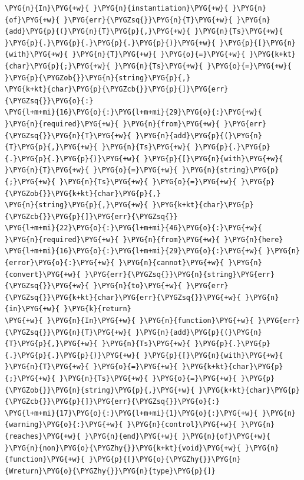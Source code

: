 \begin{codeblockbg}
\begin{Verbatim}[commandchars=\\\{\},breaklines=true,breakanywhere=true,fontsize=\codefont,xleftmargin=17bp]
\PYG{n}{In}\PYG{+w}{ }\PYG{n}{instantiation}\PYG{+w}{ }\PYG{n}{of}\PYG{+w}{ }\PYG{err}{\PYGZsq{}}\PYG{n}{T}\PYG{+w}{ }\PYG{n}{add}\PYG{p}{(}\PYG{n}{T}\PYG{p}{,}\PYG{+w}{ }\PYG{n}{Ts}\PYG{+w}{ }\PYG{p}{.}\PYG{p}{.}\PYG{p}{.}\PYG{p}{)}\PYG{+w}{ }\PYG{p}{[}\PYG{n}{with}\PYG{+w}{ }\PYG{n}{T}\PYG{+w}{ }\PYG{o}{=}\PYG{+w}{ }\PYG{k+kt}{char}\PYG{p}{;}\PYG{+w}{ }\PYG{n}{Ts}\PYG{+w}{ }\PYG{o}{=}\PYG{+w}{ }\PYG{p}{\PYGZob{}}\PYG{n}{string}\PYG{p}{,}
\PYG{k+kt}{char}\PYG{p}{\PYGZcb{}}\PYG{p}{]}\PYG{err}{\PYGZsq{}}\PYG{o}{:}
\PYG{l+m+mi}{16}\PYG{o}{:}\PYG{l+m+mi}{29}\PYG{o}{:}\PYG{+w}{   }\PYG{n}{required}\PYG{+w}{ }\PYG{n}{from}\PYG{+w}{ }\PYG{err}{\PYGZsq{}}\PYG{n}{T}\PYG{+w}{ }\PYG{n}{add}\PYG{p}{(}\PYG{n}{T}\PYG{p}{,}\PYG{+w}{ }\PYG{n}{Ts}\PYG{+w}{ }\PYG{p}{.}\PYG{p}{.}\PYG{p}{.}\PYG{p}{)}\PYG{+w}{ }\PYG{p}{[}\PYG{n}{with}\PYG{+w}{ }\PYG{n}{T}\PYG{+w}{ }\PYG{o}{=}\PYG{+w}{ }\PYG{n}{string}\PYG{p}{;}\PYG{+w}{ }\PYG{n}{Ts}\PYG{+w}{ }\PYG{o}{=}\PYG{+w}{ }\PYG{p}{\PYGZob{}}\PYG{k+kt}{char}\PYG{p}{,}
\PYG{n}{string}\PYG{p}{,}\PYG{+w}{ }\PYG{k+kt}{char}\PYG{p}{\PYGZcb{}}\PYG{p}{]}\PYG{err}{\PYGZsq{}}
\PYG{l+m+mi}{22}\PYG{o}{:}\PYG{l+m+mi}{46}\PYG{o}{:}\PYG{+w}{   }\PYG{n}{required}\PYG{+w}{ }\PYG{n}{from}\PYG{+w}{ }\PYG{n}{here}
\PYG{l+m+mi}{16}\PYG{o}{:}\PYG{l+m+mi}{29}\PYG{o}{:}\PYG{+w}{ }\PYG{n}{error}\PYG{o}{:}\PYG{+w}{ }\PYG{n}{cannot}\PYG{+w}{ }\PYG{n}{convert}\PYG{+w}{ }\PYG{err}{\PYGZsq{}}\PYG{n}{string}\PYG{err}{\PYGZsq{}}\PYG{+w}{ }\PYG{n}{to}\PYG{+w}{ }\PYG{err}{\PYGZsq{}}\PYG{k+kt}{char}\PYG{err}{\PYGZsq{}}\PYG{+w}{ }\PYG{n}{in}\PYG{+w}{ }\PYG{k}{return}
\PYG{+w}{ }\PYG{n}{In}\PYG{+w}{ }\PYG{n}{function}\PYG{+w}{ }\PYG{err}{\PYGZsq{}}\PYG{n}{T}\PYG{+w}{ }\PYG{n}{add}\PYG{p}{(}\PYG{n}{T}\PYG{p}{,}\PYG{+w}{ }\PYG{n}{Ts}\PYG{+w}{ }\PYG{p}{.}\PYG{p}{.}\PYG{p}{.}\PYG{p}{)}\PYG{+w}{ }\PYG{p}{[}\PYG{n}{with}\PYG{+w}{ }\PYG{n}{T}\PYG{+w}{ }\PYG{o}{=}\PYG{+w}{ }\PYG{k+kt}{char}\PYG{p}{;}\PYG{+w}{ }\PYG{n}{Ts}\PYG{+w}{ }\PYG{o}{=}\PYG{+w}{ }\PYG{p}{\PYGZob{}}\PYG{n}{string}\PYG{p}{,}\PYG{+w}{ }\PYG{k+kt}{char}\PYG{p}{\PYGZcb{}}\PYG{p}{]}\PYG{err}{\PYGZsq{}}\PYG{o}{:}
\PYG{l+m+mi}{17}\PYG{o}{:}\PYG{l+m+mi}{1}\PYG{o}{:}\PYG{+w}{ }\PYG{n}{warning}\PYG{o}{:}\PYG{+w}{ }\PYG{n}{control}\PYG{+w}{ }\PYG{n}{reaches}\PYG{+w}{ }\PYG{n}{end}\PYG{+w}{ }\PYG{n}{of}\PYG{+w}{ }\PYG{n}{non}\PYG{o}{\PYGZhy{}}\PYG{k+kt}{void}\PYG{+w}{ }\PYG{n}{function}\PYG{+w}{ }\PYG{p}{[}\PYG{o}{\PYGZhy{}}\PYG{n}{Wreturn}\PYG{o}{\PYGZhy{}}\PYG{n}{type}\PYG{p}{]}
\end{Verbatim}
\end{codeblockbg}


